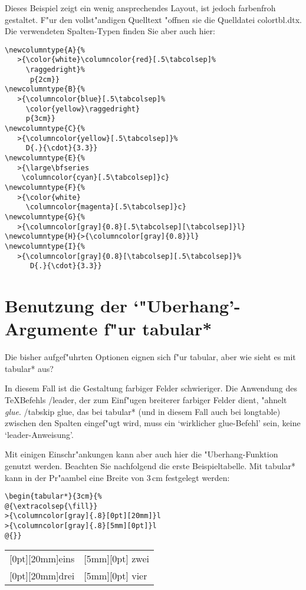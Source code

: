 \documentclass[ngerman]{article}
\begin{document}
Dieses Beispiel zeigt ein wenig ansprechendes Layout, ist jedoch farbenfroh gestaltet. 
F"ur den vollst"andigen Quelltext "offnen sie die Quelldatei
\textsf{colortbl.dtx}. Die 
verwendeten Spalten-Typen finden Sie aber auch hier:

\begin{verbatim}
\newcolumntype{A}{%
   >{\color{white}\columncolor{red}[.5\tabcolsep]%
     \raggedright}%
      p{2cm}}
\newcolumntype{B}{%
   >{\columncolor{blue}[.5\tabcolsep]%
     \color{yellow}\raggedright}
     p{3cm}}
\newcolumntype{C}{%
   >{\columncolor{yellow}[.5\tabcolsep]}%
     D{.}{\cdot}{3.3}}    
\newcolumntype{E}{%
   >{\large\bfseries
    \columncolor{cyan}[.5\tabcolsep]}c}
\newcolumntype{F}{%
   >{\color{white}
     \columncolor{magenta}[.5\tabcolsep]}c}
\newcolumntype{G}{%
   >{\columncolor[gray]{0.8}[.5\tabcolsep][\tabcolsep]}l}
\newcolumntype{H}{>{\columncolor[gray]{0.8}}l}
\newcolumntype{I}{%
   >{\columncolor[gray]{0.8}[\tabcolsep][.5\tabcolsep]}%
      D{.}{\cdot}{3.3}}    
\end{verbatim}

\section{Benutzung der `"Uberhang'-Argumente f"ur \textsf{tabular*}}

Die bisher aufgef"uhrten Optionen eignen sich f"ur tabular, aber wie sieht es mit 
\textsf{tabular*} aus?

In diesem Fall ist die Gestaltung farbiger Felder schwieriger. Die
Anwendung des
\TeX Befehls \slash \textsf{leader}, der zum Einf"ugen breiterer farbiger Felder dient, 
"ahnelt \emph{glue}. \slash \textsf{tabskip} glue, das bei \textsf{tabular*} 
(und in diesem Fall auch bei \textsf{longtable}) zwischen den Spalten eingef"ugt wird, 
muss ein `wirklicher glue-Befehl' sein, keine `leader-Anweisung'.

Mit einigen Einschr"ankungen kann aber auch hier die "Uberhang-Funktion genutzt werden. 
Beachten Sie nachfolgend die erste Beispieltabelle. Mit \textsf{tabular*} kann in der Pr"aambel 
eine Breite von 3\,cm festgelegt werden:
\begin{center}
\begin{minipage}{.6\textwidth}
\begin{verbatim}
\begin{tabular*}{3cm}{%
@{\extracolsep{\fill}}
>{\columncolor[gray]{.8}[0pt][20mm]}l
>{\columncolor[gray]{.8}[5mm][0pt]}l
@{}}
\end{verbatim}
\end{minipage}
 {\bfseries
 \begin{tabular*}{3cm}{%
 @{\extracolsep{\fill}}
 >{\columncolor[gray]{.8}[0pt][20mm]}l
 >{\columncolor[gray]{.8}[5mm][0pt]}l
 @{}%
   }
  eins & zwei\\
 drei & vier
\end{tabular*}}
\end{center}
\end{document}
